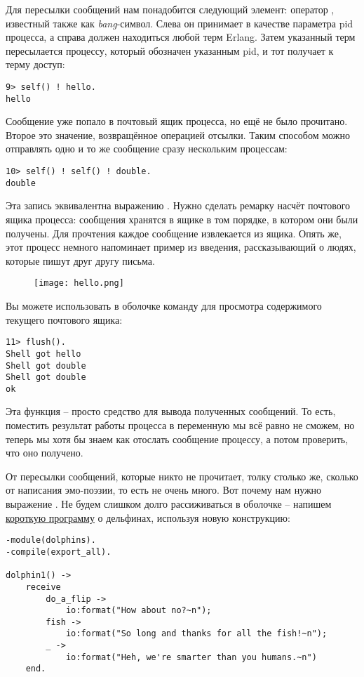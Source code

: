 Для пересылки сообщений нам понадобится следующий элемент: оператор \ops{!\strut}, известный также как \emph{bang}\--символ.
Слева он принимает в качестве параметра pid процесса, а справа должен находиться любой терм Erlang.
Затем указанный терм пересылается процессу, который обозначен указанным pid, и тот получает к терму доступ:
\begin{lstlisting}[style=erlang]
9> self() ! hello.
hello
\end{lstlisting}

Сообщение уже попало в почтовый ящик процесса, но ещё не было прочитано.
Второе  это значение, возвращённое операцией отсылки.
Таким способом можно отправлять одно и то же сообщение сразу нескольким процессам:
\begin{lstlisting}[style=erlang]
10> self() ! self() ! double.
double
\end{lstlisting}

Эта запись эквивалентна выражению .
Нужно сделать ремарку насчёт почтового ящика процесса: сообщения хранятся в ящике в том порядке, в котором они были получены.
Для прочтения каждое сообщение извлекается из ящика.
Опять же, этот процесс немного напоминает пример из введения, рассказывающий о людях, которые пишут друг другу письма.
\begin{figure}[h!]
    \centering
    \texttt{[image: hello.png]}
\end{figure}

Вы можете использовать в оболочке команду  для просмотра содержимого текущего почтового ящика:
\begin{lstlisting}[style=erlang]
11> flush().
Shell got hello
Shell got double
Shell got double
ok
\end{lstlisting}

Эта функция \--- просто средство для вывода полученных сообщений.
То есть, поместить результат работы процесса в переменную мы всё равно не сможем, но теперь мы хотя бы знаем как отослать сообщение процессу, а потом проверить, что оно получено.

От пересылки сообщений, которые никто не прочитает, толку столько же, сколько от написания эмо\--поэзии, то есть не очень много.
Вот почему нам нужно выражение .
Не будем слишком долго рассиживаться в оболочке \--- напишем  \href{http://learnyousomeerlang.com/static/erlang/dolphins.erl}{короткую программу} о дельфинах, используя новую конструкцию:
\begin{lstlisting}[style=erlang]
-module(dolphins).
-compile(export_all).
 
dolphin1() ->
    receive
        do_a_flip ->
            io:format("How about no?~n");
        fish ->
            io:format("So long and thanks for all the fish!~n");
        _ ->
            io:format("Heh, we're smarter than you humans.~n")
    end.
\end{lstlisting}

